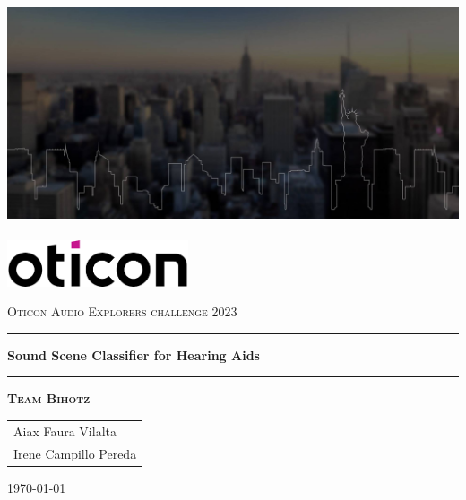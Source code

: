 
\begin{titlepage}
\begin{center}
\vspace{0cm}
\includegraphics[width=\linewidth]{root/explorer_banner.jpg}~\\[1cm]

\includegraphics[width=0.4\textwidth]{root/oticon.png}~\\[1cm]

\vspace{2cm}


\textsc{\Large Oticon Audio Explorers challenge 2023}\\[0.5cm] %

\hrule
\vspace{.5cm}
\centering
{ \Large \textbf{Sound Scene Classifier for Hearing Aids }}\\%
\vspace{.5cm}

\hrule
\vspace{1.5cm}


\textsc{\textbf{Team Bihotz}}\\
\begin{table}[H]
\centering
\label{tab:my-table}
\begin{tabular}{P{6cm}}
Aiax Faura Vilalta\\
Irene Campillo Pereda\\
\end{tabular}
\end{table}

\vspace{2cm}

\centering \today %
\end{center}
\end{titlepage}